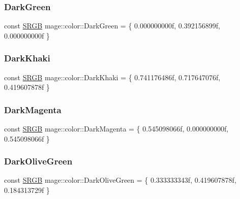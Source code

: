\subsubsection{\texorpdfstring{Dark\+Green}{DarkGreen}}
{\footnotesize\ttfamily const \hyperlink{structmage_1_1_s_r_g_b}{S\+R\+GB} mage\+::color\+::\+Dark\+Green = \{ 0.\+000000000f, 0.\+392156899f, 0.\+000000000f \}}

\hypertarget{namespacemage_1_1color_a6067beada8098c967b59540bdb11d13a}{}\label{namespacemage_1_1color_a6067beada8098c967b59540bdb11d13a} 
\subsubsection{\texorpdfstring{Dark\+Khaki}{DarkKhaki}}
{\footnotesize\ttfamily const \hyperlink{structmage_1_1_s_r_g_b}{S\+R\+GB} mage\+::color\+::\+Dark\+Khaki = \{ 0.\+741176486f, 0.\+717647076f, 0.\+419607878f \}}

\hypertarget{namespacemage_1_1color_a936a9b8794ac78320d7af30b9a85e2ed}{}\label{namespacemage_1_1color_a936a9b8794ac78320d7af30b9a85e2ed} 
\subsubsection{\texorpdfstring{Dark\+Magenta}{DarkMagenta}}
{\footnotesize\ttfamily const \hyperlink{structmage_1_1_s_r_g_b}{S\+R\+GB} mage\+::color\+::\+Dark\+Magenta = \{ 0.\+545098066f, 0.\+000000000f, 0.\+545098066f \}}

\hypertarget{namespacemage_1_1color_a66b01c0bcb06aa90694ddb1a385ed666}{}\label{namespacemage_1_1color_a66b01c0bcb06aa90694ddb1a385ed666} 
\subsubsection{\texorpdfstring{Dark\+Olive\+Green}{DarkOliveGreen}}
{\footnotesize\ttfamily const \hyperlink{structmage_1_1_s_r_g_b}{S\+R\+GB} mage\+::color\+::\+Dark\+Olive\+Green = \{ 0.\+333333343f, 0.\+419607878f, 0.\+184313729f \}}

\hypertarget{namespacemage_1_1color_a60b81cf047f12b1fb5d77d25a6be2b00}{}\label{namespacemage_1_1color_a60b81cf047f12b1fb5d77d25a6be2b00} 
